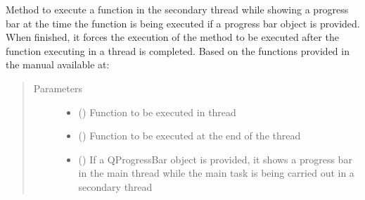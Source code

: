 \documentclass[letterpaper,10pt,english]{sphinxmanual}
\begin{document}

\begin{fulllineitems}
\label{\detokenize{gui_util:src.graphical_user_interface.util.execute_in_thread}}
\sphinxAtStartPar
Method to execute a function in the secondary thread while showing
a progress bar at the time the function is being executed if a progress bar object is provided.
When finished, it forces the execution of the method to be
executed after the function executing in a thread is completed.
Based on the functions provided in the manual available at:
\begin{quote}\begin{description}
\item[{Parameters}] \leavevmode\begin{itemize}
\item {} 
\sphinxAtStartPar
{} () \textendash{} Function to be executed in thread

\item {} 
\sphinxAtStartPar
{} () \textendash{} Function to be executed at the end of the thread

\item {} 
\sphinxAtStartPar
{} () \textendash{} If a QProgressBar object is provided, it shows a progress bar in the
main thread while the main task is being carried out in a secondary thread

\end{itemize}

\end{description}\end{quote}

\end{fulllineitems}

\end{document}
